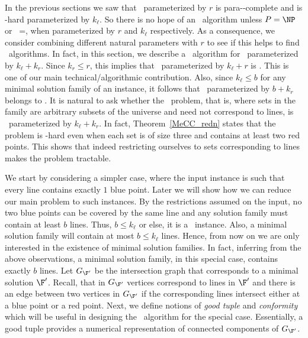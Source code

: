 









In the previous sections we saw that \slrbsc\ parameterized by $r$ is para-\NP-complete and is  \W[1]-hard parameterized by 
$k_\ell$.  So there is no hope of an \FPT\ algorithm unless $P = \NP$ or \FPT\ =\W[1], when parameterized by $r$ and $k_\ell$ respectively.  As a consequence, we consider combining different natural parameters with $r$ to see if this helps to find \FPT\ algorithms. In fact, in this section, we describe a \FPT\ algorithm for \slrbsc\ parameterized by $k_\ell+k_r$.  Since $k_r \leq r$, this implies that \slrbsc\ parameterized by $k_\ell+ r$ is \FPT. This is one of our main technical/algorithmic contribution. 
Also, since $k_\ell \leq b$ for any minimal solution family of an instance, it follows that \slrbsc\ parameterized by $b+k_r$ belongs to \FPT. It is natural to ask whether the \srbsc\ problem, that is, where sets in the family are arbitrary subsets  of the universe and need not correspond to lines, is \FPT\ parameterized by $k_\ell+k_r$. In fact, Theorem~\ref{MeCC_redn} states that the problem is \W[1]-hard even when each set is of size three and contains at least two red points. This shows that indeed restricting ourselves to sets corresponding to lines makes the problem tractable. 











We start by considering a simpler case, where the input instance is such that every line contains exactly $1$ blue point. Later we will show how we can reduce our main problem to such instances. By the restrictions assumed on the input, no two blue points can be covered by the same line and any solution family must contain at least $b$ lines. Thus, $b\leq k_\ell$ or else, it is a \NO\ instance. Also, a minimal solution family will contain at most $b\leq k_\ell$ lines. Hence, from now on we are only interested in the existence of minimal solution families. In fact, inferring from the above observations, a minimal solution family, in this special case, contains exactly $b$ lines. Let $G_{\F'}$ be the intersection graph that corresponds to a minimal solution $\F'$. Recall, that in $G_{\F'}$ vertices correspond to lines in $\F'$ and there is an edge between two vertices  in $G_{\F'}$ if the corresponding lines intersect either at a blue point or a red point. Next, we define notions of 
{\em good tuple} and {\em conformity} which will be useful in designing the \FPT\ algorithm for the special case. 
Essentially, a good tuple provides a numerical representation of connected components of $G_{\F'}$. 

